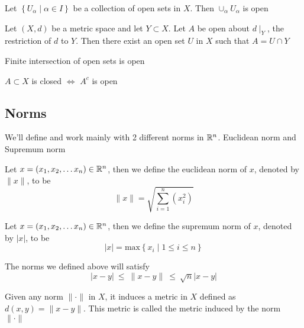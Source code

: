 \begin{fact}
    Let $\left\{ U_\alpha \mid \alpha \in I \right\}$ be a collection of open sets in $X$. Then $\cup_\alpha U_\alpha$ is open
\end{fact}

\begin{fact}
    Let $(X,d)$ be a metric space and let $Y\subset X$. Let $A$ be open about $d\mid_Y$, the restriction of $d$ to $Y$. Then there exist an open set $U$ in $X$ such that $A = U \cap Y$
\end{fact}

\begin{fact}
    Finite intersection of open sets is open
\end{fact}

\begin{fact}
    $A \subset X$ is closed $\iff$ $A^c$ is open
\end{fact}



\subsection{Norms}
We'll define and work mainly with 2 different norms in $\mathbb R^n$. Euclidean norm and Supremum norm

\begin{definition}
    \label{def:l2_norm}
    Let $x=(x_1, x_2, \ldots x_n) \in \mathbb R^n$, then we define the euclidean norm of $x$, denoted by $\|x\|$, to be $$\|x\| = \sqrt{\sum_{i=1}^{n}(x_i^2)}$$
\end{definition}

\begin{definition}
    \label{def:sup_norm}
    Let $x=(x_1, x_2, \ldots x_n) \in \mathbb R^n$, then we define the supremum norm of $x$, denoted by $\vert x \vert$, to be $$\vert x \vert = \text{max}\left\{x_i \mid 1 \le i \le n \right\}$$
\end{definition}

\begin{fact}
    The norms we defined above will satisfy $$\vert x-y \vert \ \le \ \| x-y \| \ \le \ \sqrt{n} \vert x-y \vert $$
\end{fact}

\begin{fact}
    Given any norm $\|\cdot\|$ in $X$, it induces a metric in $X$ defined as $d(x, y) = \|x-y\|$. This metric is called the metric induced by the norm $\|\cdot\|$
\end{fact}

